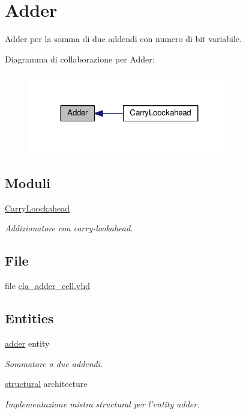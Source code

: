 \hypertarget{group___adder}{\section{Adder}
\label{group___adder}
}


Adder per la somma di due addendi con numero di bit variabile.  


Diagramma di collaborazione per Adder\+:\nopagebreak
\begin{figure}[H]
\begin{center}
\leavevmode
\includegraphics[width=251pt]{group___adder}
\end{center}
\end{figure}
\subsection*{Moduli}
\begin{DoxyCompactItemize}
\item 
\hyperlink{group___carry_loockahead}{Carry\+Loockahead}
\begin{DoxyCompactList}\small\item\em Addizionatore con carry-\/lookahead. \end{DoxyCompactList}\end{DoxyCompactItemize}
\subsection*{File}
\begin{DoxyCompactItemize}
\item 
file \hyperlink{cla__adder__cell_8vhd}{cla\+\_\+adder\+\_\+cell.\+vhd}
\end{DoxyCompactItemize}
\subsection*{Entities}
\begin{DoxyCompactItemize}
\item 
\hyperlink{classadder}{adder} entity
\begin{DoxyCompactList}\small\item\em Sommatore a due addendi. \end{DoxyCompactList}\item 
\hyperlink{classadder_1_1structural}{structural} architecture
\begin{DoxyCompactList}\small\item\em Implementazione mistra structural per l'entity adder. \end{DoxyCompactList}\end{DoxyCompactItemize}
